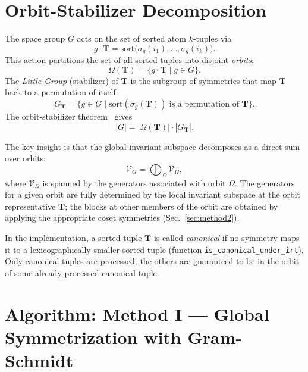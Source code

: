 \documentclass[twocolumn,amsmath,amssymb,aps,prb,10pt,floatfix]{revtex4-2}
\newcommand{\vT}{\mathbf{T}}
\begin{document}
\section{Orbit-Stabilizer Decomposition}
\label{sec:orbit}

The space group $G$ acts on the set of sorted atom $k$-tuples via
\begin{equation}
g \cdot \vT = \mathrm{sort}\bigl(\sigma_g(i_1), \dots, \sigma_g(i_k)\bigr).
\end{equation}
This action partitions the set of all sorted tuples into disjoint \emph{orbits}:
\begin{equation}
\Omega(\vT) = \bigl\{ g \cdot \vT \;\big|\; g \in G \bigr\}.
\end{equation}
The \emph{Little Group} (stabilizer) of $\vT$ is the subgroup of symmetries that map $\vT$ back to a permutation of itself:
\begin{equation}
G_{\vT} = \bigl\{ g \in G \;\big|\; \mathrm{sort}(\sigma_g(\vT))
          \text{ is a permutation of } \vT \bigr\}.
\label{eq:little_group}
\end{equation}
The orbit-stabilizer theorem~\cite{Serre1977,Dresselhaus2008} gives
\begin{equation}
|G| = |\Omega(\vT)| \cdot |G_{\vT}|.
\label{eq:orbit_stabilizer}
\end{equation}

The key insight is that the global invariant subspace decomposes as a direct sum over orbits:
\begin{equation}
\mathcal{V}_G = \bigoplus_{\Omega} \mathcal{V}_{\Omega},
\end{equation}
where $\mathcal{V}_{\Omega}$ is spanned by the generators associated with orbit $\Omega$.
The generators for a given orbit are fully determined by the local invariant subspace at the orbit representative $\vT$; the blocks at other members of the orbit are obtained by applying the appropriate coset symmetries (Sec.~\ref{sec:method2}).

In the implementation, a sorted tuple $\vT$ is called \emph{canonical} if no symmetry maps it to a lexicographically smaller sorted tuple (function \texttt{is\_canonical\_under\_irt}).
Only canonical tuples are processed; the others are guaranteed to be in the orbit of some already-processed canonical tuple.


\section{Algorithm: Method I --- Global Symmetrization with Gram-Schmidt}
\label{sec:method1}
\end{document}

